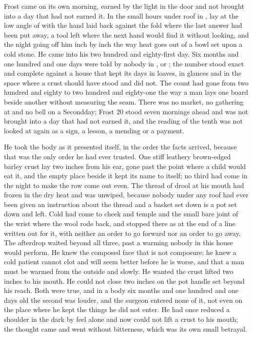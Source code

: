 
Frost came on its own morning, earned by the light in the door and not brought into a day that had not earned it. In the small hours under  roof in ,  lay at the low angle of  with the hand laid back against the fold where the last answer had been put away, a tool left where the next hand would find it without looking, and the night going off him inch by inch the way heat goes out of a bowl set upon a cold stone. He came into his two hundred and eighty-first day. Six months and one hundred and one days were told by nobody in ,  or ; the number stood exact and complete against a house that kept its days in loaves, in glances and in the space where a crust should have stood and did not. The count had gone from two hundred and eighty to two hundred and eighty-one the way a man lays one board beside another without measuring the seam. There was no market, no gathering at  and no bell on a Secondday; Frost 20 stood seven mornings ahead and was not brought into a day that had not earned it, and the reading of the tenth was not looked at again as a sign, a lesson, a mending or a payment.

He took the body as it presented itself, in the order the facts arrived, because that was the only order he had ever trusted. One stiff leathery brown-edged barley crust lay two inches from his ear, gone past the point where a child would eat it, and the empty place beside it kept its name to itself; no third had come in the night to make the row come out even. The thread of drool at his mouth had frozen in the dry heat and was unwiped, because nobody under any roof had ever been given an instruction about the thread and a basket set down is a pot set down and left. Cold had come to cheek and temple and the small bare joint of the wrist where the wool rode back, and stopped there as at the end of a line written out for it, with neither an order to go forward nor an order to go away. The afterdrop waited beyond all three, past a warming nobody in this house would perform. He knew the composed face that is not composure; he knew a cold patient cannot clot and will seem better before he is worse, and that a man must be warmed from the outside and slowly. He wanted the crust lifted two inches to his mouth. He could not close two inches on the pot handle set beyond his reach. Both were true, and in a body six months and one hundred and one days old the second was louder, and the surgeon entered none of it, not even on the place where he kept the things he did not enter. He had once reduced a shoulder in the dark by feel alone and now could not lift a crust to his mouth; the thought came and went without bitterness, which was its own small betrayal.

